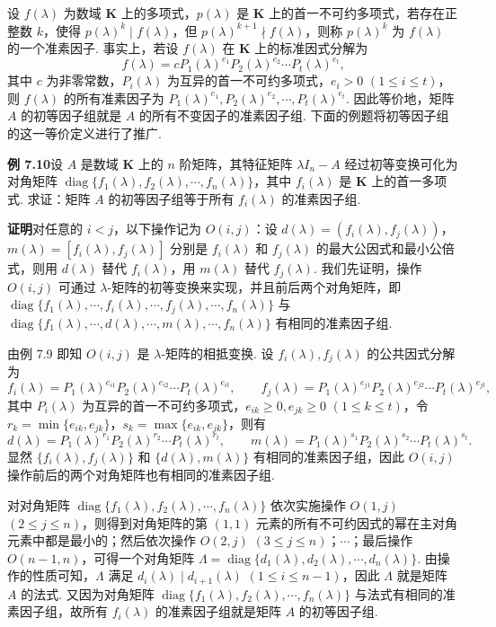 \documentclass[UTF8, 12pt, fontset=fandol, oneside]{ctexart}
\begin{document}
设 $f(\lambda)$ 为数域 $\mathbf{K}$ 上的多项式，$p(\lambda)$ 是 $\mathbf{K}$ 上的首一不可约多项式，若存在正整数 $k$，使得 $p(\lambda)^k\mid f(\lambda)$，但 $p(\lambda)^{k+1}\nmid f(\lambda)$，则称 $p(\lambda)^k$ 为 $f(\lambda)$ 的一个准素因子. 事实上，若设 $f(\lambda)$ 在 $\mathbf{K}$ 上的标准因式分解为
\[
f(\lambda)=cP_1(\lambda)^{e_1}P_2(\lambda)^{e_2}\cdots P_t(\lambda)^{e_t},
\]
其中 $c$ 为非零常数，$P_i(\lambda)$ 为互异的首一不可约多项式，$e_i>0$ $(1\le i\le t)$，则 $f(\lambda)$ 的所有准素因子为 $P_1(\lambda)^{e_1},P_2(\lambda)^{e_2},\cdots,P_t(\lambda)^{e_t}$. 因此等价地，矩阵 $A$ 的初等因子组就是 $A$ 的所有不变因子的准素因子组. 下面的例题将初等因子组的这一等价定义进行了推广.

\noindent\textbf{例 7.10}\quad 设 $A$ 是数域 $\mathbf{K}$ 上的 $n$ 阶矩阵，其特征矩阵 $\lambda I_n-A$ 经过初等变换可化为对角矩阵 $\operatorname{diag}\{f_1(\lambda),f_2(\lambda),\cdots,f_n(\lambda)\}$，其中 $f_i(\lambda)$ 是 $\mathbf{K}$ 上的首一多项式. 求证：矩阵 $A$ 的初等因子组等于所有 $f_i(\lambda)$ 的准素因子组.

\noindent\textbf{证明}\quad 对任意的 $i<j$，以下操作记为 $O(i,j)$：设 $d(\lambda)=(f_i(\lambda),f_j(\lambda))$，$m(\lambda)=[f_i(\lambda),f_j(\lambda)]$ 分别是 $f_i(\lambda)$ 和 $f_j(\lambda)$ 的最大公因式和最小公倍式，则用 $d(\lambda)$ 替代 $f_i(\lambda)$，用 $m(\lambda)$ 替代 $f_j(\lambda)$. 我们先证明，操作 $O(i,j)$ 可通过 $\lambda$-矩阵的初等变换来实现，并且前后两个对角矩阵，即 $\operatorname{diag}\{f_1(\lambda),\cdots,f_i(\lambda),\cdots,f_j(\lambda),\cdots,f_n(\lambda)\}$ 与 $\operatorname{diag}\{f_1(\lambda),\cdots,d(\lambda),\cdots,m(\lambda),\cdots,f_n(\lambda)\}$ 有相同的准素因子组.

由例 7.9 即知 $O(i,j)$ 是 $\lambda$-矩阵的相抵变换. 设 $f_i(\lambda),f_j(\lambda)$ 的公共因式分解为
\[
f_i(\lambda)=P_1(\lambda)^{e_{i1}}P_2(\lambda)^{e_{i2}}\cdots P_t(\lambda)^{e_{it}},\qquad
f_j(\lambda)=P_1(\lambda)^{e_{j1}}P_2(\lambda)^{e_{j2}}\cdots P_t(\lambda)^{e_{jt}},
\]
其中 $P_i(\lambda)$ 为互异的首一不可约多项式，$e_{ik}\ge 0,e_{jk}\ge 0$ $(1\le k\le t)$，令 $r_k=\min\{e_{ik},e_{jk}\}$，$s_k=\max\{e_{ik},e_{jk}\}$，则有
\[
d(\lambda)=P_1(\lambda)^{r_1}P_2(\lambda)^{r_2}\cdots P_t(\lambda)^{r_t},\qquad
m(\lambda)=P_1(\lambda)^{s_1}P_2(\lambda)^{s_2}\cdots P_t(\lambda)^{s_t}.
\]
显然 $\{f_i(\lambda),f_j(\lambda)\}$ 和 $\{d(\lambda),m(\lambda)\}$ 有相同的准素因子组，因此 $O(i,j)$ 操作前后的两个对角矩阵也有相同的准素因子组.

对对角矩阵 $\operatorname{diag}\{f_1(\lambda),f_2(\lambda),\cdots,f_n(\lambda)\}$ 依次实施操作 $O(1,j)$ $(2\le j\le n)$，则得到对角矩阵的第 $(1,1)$ 元素的所有不可约因式的幂在主对角元素中都是最小的；然后依次操作 $O(2,j)$ $(3\le j\le n)$；$\cdots$；最后操作 $O(n-1,n)$，可得一个对角矩阵 $\Lambda=\operatorname{diag}\{d_1(\lambda),d_2(\lambda),\cdots,d_n(\lambda)\}$. 由操作的性质可知，$\Lambda$ 满足 $d_i(\lambda)\mid d_{i+1}(\lambda)$ $(1\le i\le n-1)$，因此 $\Lambda$ 就是矩阵 $A$ 的法式. 又因为对角矩阵 $\operatorname{diag}\{f_1(\lambda),f_2(\lambda),\cdots,f_n(\lambda)\}$ 与法式有相同的准素因子组，故所有 $f_i(\lambda)$ 的准素因子组就是矩阵 $A$ 的初等因子组.
\end{document}
